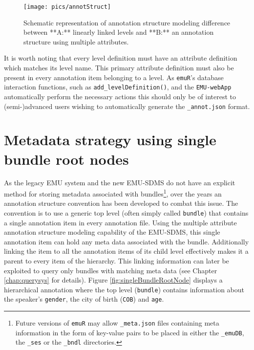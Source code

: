 \documentclass[]{book}
\begin{document}
\begin{figure}

{\centering \texttt{[image: pics/annotStruct]} 

}

\caption{Schematic representation of annotation structure modeling difference between **A:** linearly linked levels and **B:** an annotation structure using multiple attributes.}\label{fig:paraLabels}
\end{figure}

It is worth noting that every level definition must have an attribute definition which matches its level name. This primary attribute definition must also be present in every annotation item belonging to a level. As \texttt{emuR}'s database interaction functions, such as \texttt{add\_levelDefinition()}, and the \texttt{EMU-webApp} automatically perform the necessary actions this should only be of interest to (semi-)advanced users wishing to automatically generate the \texttt{\_annot.json} format.

\hypertarget{metadata-strategy-using-single-bundle-root-nodes}{%
\section{Metadata strategy using single bundle root nodes}\label{metadata-strategy-using-single-bundle-root-nodes}}

As the legacy EMU system and the new EMU-SDMS do not have an explicit method for storing metadata associated with bundles\footnote{Future versions of \texttt{emuR} may allow \texttt{\_meta.json} files containing meta information in the form of key-value pairs to be placed in either the \texttt{\_emuDB}, the \texttt{\_ses} or the \texttt{\_bndl} directories.}, over the years an annotation structure convention has been developed to combat this issue. The convention is to use a generic top level (often simply called \texttt{bundle}) that contains a single annotation item in every annotation file. Using the multiple attribute annotation structure modeling capability of the EMU-SDMS, this single annotation item can hold any meta data associated with the bundle. Additionally linking the item to all the annotation items of its child level effectively makes it a parent to every item of the hierarchy. This linking information can later be exploited to query only bundles with matching meta data (see Chapter \ref{chap:querysys} for details). Figure \ref{fig:singleBundleRootNode} displays a hierarchical annotation where the top level (\texttt{bundle}) contains information about the speaker's \texttt{gender}, the city of birth (\texttt{COB}) and \texttt{age}.
\end{document}

